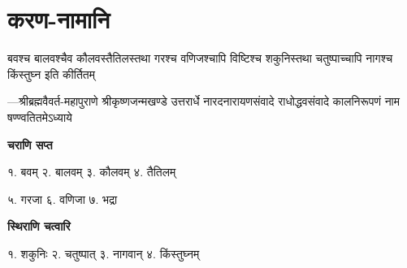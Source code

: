 \chapter{करण-नामानि}
\label{app:karana_names}

\addtocounter{shlokacount}{81}
\threelineshloka
{बवश्च बालवश्चैव कौलवस्तैतिलस्तथा}
{गरश्च वणिजश्चापि विष्टिश्च शकुनिस्तथा}
{चतुष्पाच्चापि नागश्च किंस्तुघ्न इति कीर्तितम्}

{\fontsize{10}{4}\selectfont —श्रीब्रह्मवैवर्त-महापुराणे श्रीकृष्णजन्मखण्डे उत्तरार्धे नारदनारायणसंवादे राधोद्धवसंवादे कालनिरूपणं नाम षण्ण्वतितमेऽध्याये}

\begin{center}
{\bfseries {चराणि सप्त}}

१. बवम् \hspace{2ex} २. बालवम् \hspace{2ex} ३. कौलवम् \hspace{2ex} ४. तैतिलम्

५. गरजा \hspace{2ex} ६. वणिजा  \hspace{2ex}७. भद्रा

{\bfseries {स्थिराणि चत्वारि}}

१. शकुनिः \hspace{2ex} २. चतुष्पात् \hspace{2ex} ३. नागवान् \hspace{2ex} ४. किंस्तुघ्नम्

\end{center}


